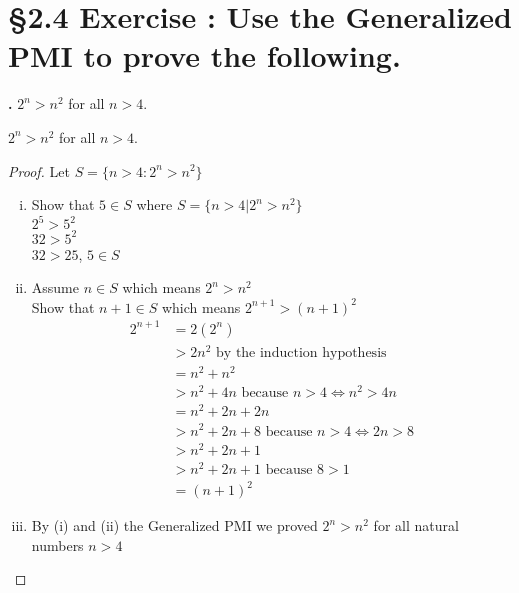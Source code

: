 \documentclass[a4paper,11pt]{article}
\begin{document}
\newpage

\setcounter{ProblemCounter}{8}
\setcounter{SubsectionCounter}{2}
\section*{\S 2.4 Exercise : Use the Generalized PMI to prove the following.}
\textbf{.}
\(2^n > n^2\) for all \(n > 4\).
\begin{theorem1}
  \(2^n > n^2\) for all \(n > 4\).
\begin{proof}
  Let \(S=\{n > 4: 2^n > n^2\}\)
  \begin{enumerate}[(i)]
    \item Show that \(5 \in S\) where \(S = \{n >4 | 2^n > n^2\}\)\\
    \(2^5 > 5^2\)\\
    \(32 > 5^2\)\\
    \(32 > 25\),  \(5 \in S\)
    \newpage
    \item Assume \(n \in S\) which means \(2^n > n^2\)\\
    Show that \(n+1 \in S\) which means \(2^{n+1} > {(n+1)}^2\)
    \begin{align*}
      2^{n+1} &= 2{(2^n)}\\
      &> 2n^2 \text{ by the induction hypothesis}\\
      &= n^2 + n^2\\
      &> n^2 + 4n \text{ because } n > 4 \Leftrightarrow n^2 > 4n\\
      &= n^2 + 2n + 2n\\
      &> n^2 +2n + 8 \text{ because } n > 4 \Leftrightarrow 2n > 8\\
      &> n^2 +2n +1\\ 
      &> n^2 + 2n + 1 \text{ because } 8 > 1\\
      &= {(n+1)}^2
    \end{align*}
    \item By {(i)} and {(ii)} the Generalized PMI we proved  \(2^n > n^2\) for all natural numbers \(n > 4\)
  \end{enumerate}
\end{proof}  
\end{theorem1}

\newpage

\setcounter{ProblemCounter}{8}
\setcounter{SubsectionCounter}{5}
\end{document}
